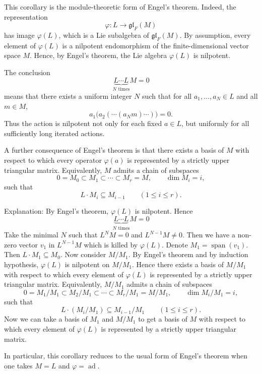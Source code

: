 \begin{remark}
    This corollary is the module-theoretic form of Engel's theorem. Indeed, the representation
    \[
        \varphi:L\to \mathfrak{gl}_F(M)
    \]
    has image $\varphi(L)$, which is a Lie subalgebra of $\mathfrak{gl}_F(M)$. By assumption, every element of $\varphi(L)$ is a nilpotent endomorphism of the finite-dimensional vector space $M$. Hence, by Engel's theorem, the Lie algebra $\varphi(L)$ is nilpotent.

    The conclusion
    \[
        \underbrace{L\cdots L}_{N\text{ times}}M=0
    \]
    means that there exists a uniform integer $N$ such that for all $a_1,\dots,a_N\in L$ and all $m\in M$,
    \[
        a_1\bigl(a_2(\cdots(a_Nm)\cdots)\bigr)=0.
    \]
    Thus the action is nilpotent not only for each fixed $a\in L$, but uniformly for all sufficiently long iterated actions.

    A further consequence of Engel's theorem is that there exists a basis of $M$ with respect to which every operator $\varphi(a)$ is represented by a strictly upper triangular matrix. Equivalently, $M$ admits a chain of subspaces
    \[
        0=M_0\subset M_1\subset \cdots \subset M_r=M,
        \qquad \dim M_i=i,
    \]
    such that
    \[
        L\cdot M_i\subseteq M_{i-1}
        \qquad (1\le i\le r).
    \]

    Explanation: By Engel's theorem, $\varphi(L)$ is nilpotent. Hence
    \[
        \underbrace{L\cdots L}_{N\text{ times}}M=0
    \]
    Take the minimal $N$ such that $L^N M=0$ and $L^{N-1}M \neq 0$. Then we have a non-zero vector $v_1$ in $L^{N-1}M$ which is killed by $\varphi(L)$. Denote $M_1 = \operatorname{span}(v_1)$. Then $L\cdot M_1 \subseteq M_0$. Now consider $M/M_1$. By Engel's theorem and by induction hypothesis, $\varphi(L)$ is nilpotent on $M/M_1$. Hence there exists a basis of $M/M_1$ with respect to which every element of $\varphi(L)$ is represented by a strictly upper triangular matrix. Equivalently, $M/M_1$ admits a chain of subspaces
    \[
        0=M_1/M_1\subset M_2/M_1\subset \cdots \subset M_r/M_1=M/M_1,
        \qquad \dim M_i/M_1=i,
    \]
    such that
    \[
        L\cdot (M_i/M_1)\subseteq M_{i-1}/M_1
        \qquad (1\le i\le r).
    \]
    Now we can take a basis of $M_1$ and $M/M_1$ to get a basis of $M$ with respect to which every element of $\varphi(L)$ is represented by a strictly upper triangular matrix.

    In particular, this corollary reduces to the usual form of Engel's theorem when one takes $M=L$ and $\varphi=\operatorname{ad}$.
\end{remark}

